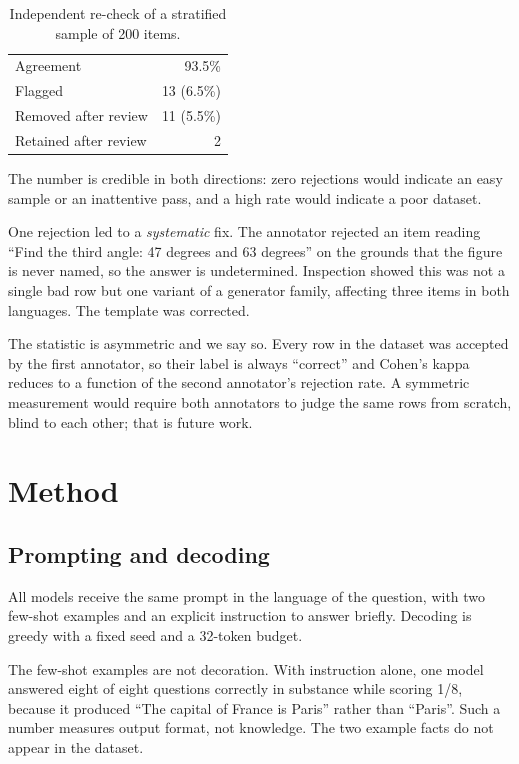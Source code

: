 \documentclass[final]{clv2025}
\begin{document}
\begin{table}[h!]
\caption{Independent re-check of a stratified sample of 200 items.}
\label{tab:agreement}
\centering
\begin{tabular}{lr}
\toprule
Agreement & 93.5\% \\
Flagged & 13 (6.5\%) \\
Removed after review & 11 (5.5\%) \\
Retained after review & 2 \\
\bottomrule
\end{tabular}
\end{table}

The number is credible in both directions: zero rejections would indicate an
easy sample or an inattentive pass, and a high rate would indicate a poor
dataset.

One rejection led to a \emph{systematic} fix. The annotator rejected an item
reading ``Find the third angle: 47 degrees and 63 degrees'' on the grounds that
the figure is never named, so the answer is undetermined. Inspection showed
this was not a single bad row but one variant of a generator family, affecting
three items in both languages. The template was corrected.

The statistic is asymmetric and we say so. Every row in the dataset was
accepted by the first annotator, so their label is always ``correct'' and
Cohen's kappa reduces to a function of the second annotator's rejection rate. A
symmetric measurement would require both annotators to judge the same rows from
scratch, blind to each other; that is future work.

\section{Method}

\subsection{Prompting and decoding}

All models receive the same prompt in the language of the question, with two
few-shot examples and an explicit instruction to answer briefly. Decoding is
greedy with a fixed seed and a 32-token budget.

The few-shot examples are not decoration. With instruction alone, one model
answered eight of eight questions correctly in substance while scoring 1/8,
because it produced ``The capital of France is Paris'' rather than ``Paris''.
Such a number measures output format, not knowledge. The two example facts do
not appear in the dataset.
\end{document}
